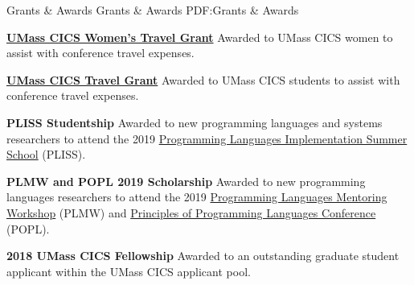 \Section
{Grants \& Awards}
{Grants \& Awards}
{PDF:Grants \& Awards}

\Entry
\href{http://cswomenumass.github.io//travelgrant.html}{\textbf{UMass CICS Women's Travel Grant}}
\dotfill
\textbf{}
\SubEntry
\Gap
Awarded to UMass CICS women to assist with conference travel expenses.

\Entry
\href{https://www.cics.umass.edu/grads/student-forms}{\textbf{UMass CICS Travel Grant}}
\dotfill
\textbf{}
\SubEntry
\Gap
Awarded to UMass CICS students to assist with conference travel expenses.

\Entry
\textbf{PLISS Studentship}
\dotfill
\textbf{}
\SubEntry
\Gap
Awarded to new programming languages and systems researchers to attend the 2019 \href{https://pliss2019.github.io/}{Programming Languages Implementation Summer School} (PLISS).

\Entry
\textbf{PLMW and POPL 2019 Scholarship}
\dotfill
\textbf{}
\SubEntry
\Gap
Awarded to new programming languages researchers to attend the 2019 \href{https://popl19.sigplan.org/track/PLMW-2019-papers}{Programming Languages Mentoring Workshop} (PLMW)
and \href{https://popl19.sigplan.org/}{Principles of Programming Languages Conference} (POPL).

\BigGap
\Entry
\textbf{2018 UMass CICS Fellowship}
\dotfill
\textbf{}
\SubEntry
\Gap
Awarded to an outstanding graduate student applicant within the UMass CICS applicant pool.
